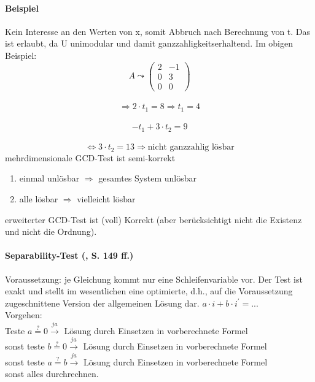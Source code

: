 \paragraph{Beispiel}
Kein Interesse an den Werten von x, somit Abbruch nach Berechnung von t. Das ist erlaubt, da U unimodular und damit \glqq ganzzahligkeitserhaltend\grqq .
Im obigen Beispiel:\\
\[ A \leadsto
\begin{pmatrix}
2 &  -1 \\
0 & 3 \\
0 & 0
\end{pmatrix}
\] \\
\[\Rightarrow 2 \cdot t_1 = 8 \Rightarrow t_1 = 4 \] \\
\[-t_1 + 3 \cdot t_2 = 9 \] \\
\[\Leftrightarrow 3 \cdot t_2 = 13 \Rightarrow \text{nicht ganzzahlig lösbar}
\]
mehrdimensionale GCD-Test ist \glqq semi-korrekt\grqq \\
\begin{enumerate}
  \item einmal unlösbar \( \Rightarrow \) gesamtes System unlösbar
  \item alle lösbar \( \Rightarrow \) vielleicht lösbar
\end{enumerate}
erweiterter GCD-Test ist (voll) Korrekt (aber berücksichtigt nicht die Existenz und nicht die Ordnung).


\paragraph{Separability-Test (\cite{Zima90}, S. 149 ff.)}

Voraussetzung: je Gleichung kommt nur eine Schleifenvariable vor.  Der
Test ist exakt und stellt im wesentlichen eine optimierte, d.h., auf die
Voraussetzung zugeschnittene Version der allgemeinen Lösung dar.
\( a \cdot i + b \cdot i^\prime = \text{...} \) \\
Vorgehen:\\
Teste \(a \stackrel{?}{=} 0 \stackrel{ja}{\rightarrow} \) Lösung durch Einsetzen in vorberechnete Formel\\
sonst teste \(b \stackrel{?}{=} 0 \stackrel{ja}{\rightarrow} \) Lösung durch Einsetzen in vorberechnete Formel\\
sonst teste \(a \stackrel{?}{=} b \stackrel{ja}{\rightarrow} \) Lösung durch Einsetzen in vorberechnete Formel\\
sonst alles durchrechnen.

